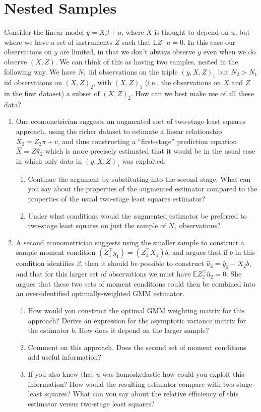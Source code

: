 \documentclass[12pt]{amsart}
\newcommand{\T}{\top}
\renewcommand{\E}{\ensuremath{\mathds{E}}}
\begin{document}
\section{Nested Samples}
\label{sec:orgdf1ab2a}
Consider the linear model \(y=X\beta + u\), where \(X\) is thought to
depend on \(u\), but where we have a set of instruments \(Z\) such that
\(\E Z^\T u = 0\).  In this case our observations on \(y\) are limited,
in that we don't always observe \(y\) even when we do observe
\((X,Z)\).  We can think of this as having two samples, nested in the
following way.  We have \(N_1\) iid observations on the triple
\((y,X,Z)_1\) but \(N_2>N_1\) iid observations on \((X,Z)_2\), with \((X,Z)_1\)
(i.e., the observations on \(X\) and \(Z\) in the first dataset) a
subset of \((X,Z)_2\).  How can we best make use of all these data?
\begin{enumerate}
\item One econometrician suggests an augmented sort of two-stage-least
squares approach, using the richer dataset to estimate a
linear relationship \(X_2 = Z_2\pi + v\), and thus constructing a
``first-stage'' prediction equation \(\hat{X} = Z\hat{\pi}_2\) which
is more precisely estimated that it would be in the usual case in
which only data in \((y,X,Z)_1\) was exploited.
\begin{enumerate}
\item Continue the argument by substituting into the second stage.
What can you say about the properties of the augmented
estimator compared to the properties of the usual
two-stage least squares estimator?
\item Under what conditions would the augmented estimator be
preferred to two-stage least squares on just the sample of
\(N_1\) observations?
\end{enumerate}

\item A second econometrician suggests using the smaller sample to
construct a sample moment condition \((Z_1^\T y_1)=(Z_1^\T X_1)b\),
and argues that if \(b\) in this condition identifies \(\beta\), then
it should be possible to construct \(\hat{u}_2 = \hat{y}_2 -
     X_2b\), and that for this larger set of observations we must have
\(\E Z_2^\T\hat{u}_2 = 0\).  She argues that these two sets of moment
conditions could then be combined into an over-identified
optimally-weighted GMM estimator.
\begin{enumerate}
\item How would you construct the optimal GMM weighting matrix for
this approach?  Derive an expression for the asymptotic
variance matrix for the estimator \(b\).  How does it depend on
the larger sample?
\item Comment on this approach.  Does the second set of moment
conditions add useful information?
\item If you also knew that \(u\) was homoskedastic how could you
exploit this information?  How would the resulting estimator
compare with two-stage-least squares?  What can you say about
the relative efficiency of this estimator versus two-stage
least squares?
\end{enumerate}
\end{enumerate}


\printbibliography
\end{document}
